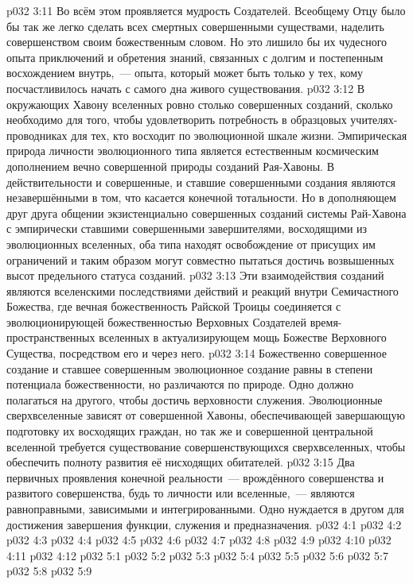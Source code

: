 \vs p032 3:11 Во всём этом проявляется мудрость Создателей. Всеобщему Отцу было бы так же легко сделать всех смертных совершенными существами, наделить совершенством своим божественным словом. Но это лишило бы их чудесного опыта приключений и обретения знаний, связанных с долгим и постепенным восхождением внутрь,~--- опыта, который может быть только у тех, кому посчастливилось начать с самого дна живого существования.
\vs p032 3:12 В окружающих Хавону вселенных ровно столько совершенных созданий, сколько необходимо для того, чтобы удовлетворить потребность в образцовых учителях\hyp{}проводниках для тех, кто восходит по эволюционной шкале жизни. Эмпирическая природа личности эволюционного типа является естественным космическим дополнением вечно совершенной природы созданий Рая\hyp{}Хавоны. В действительности и совершенные, и ставшие совершенными создания являются незавершёнными в том, что касается конечной тотальности. Но в дополняющем друг друга общении экзистенциально совершенных созданий системы Рай\hyp{}Хавона с эмпирически ставшими совершенными завершителями, восходящими из эволюционных вселенных, оба типа находят освобождение от присущих им ограничений и таким образом могут совместно пытаться достичь возвышенных высот предельного статуса созданий.
\vs p032 3:13 Эти взаимодействия созданий являются вселенскими последствиями действий и реакций внутри Семичастного Божества, где вечная божественность Райской Троицы соединяется с эволюционирующей божественностью Верховных Создателей время\hyp{}пространственных вселенных в актуализирующем мощь Божестве Верховного Существа, посредством его и через него.
\vs p032 3:14 Божественно совершенное создание и ставшее совершенным эволюционное создание равны в степени потенциала божественности, но различаются по природе. Одно должно полагаться на другого, чтобы достичь верховности служения. Эволюционные сверхвселенные зависят от совершенной Хавоны, обеспечивающей завершающую подготовку их восходящих граждан, но так же и совершенной центральной вселенной требуется существование совершенствующихся сверхвселенных, чтобы обеспечить полноту развития её нисходящих обитателей.
\vs p032 3:15 Два первичных проявления конечной реальности~--- врождённого совершенства и развитого совершенства, будь то личности или вселенные,~--- являются равноправными, зависимыми и интегрированными. Одно нуждается в другом для достижения завершения функции, служения и предназначения.
\vs p032 4:1 
\vs p032 4:2 
\vs p032 4:3 \pc 
\vs p032 4:4 
\vs p032 4:5 \pc 
\vs p032 4:6 \pc 
\vs p032 4:7 
\vs p032 4:8 
\vs p032 4:9 \pc 
\vs p032 4:10 \pc 
\vs p032 4:11 
\vs p032 4:12 
\vs p032 5:1 
\vs p032 5:2 
\vs p032 5:3 \pc 
\vs p032 5:4 
\vs p032 5:5 
\vs p032 5:6 
\vs p032 5:7 \pc 
\vs p032 5:8 
\vsetoff
\vs p032 5:9 
\quizlink
